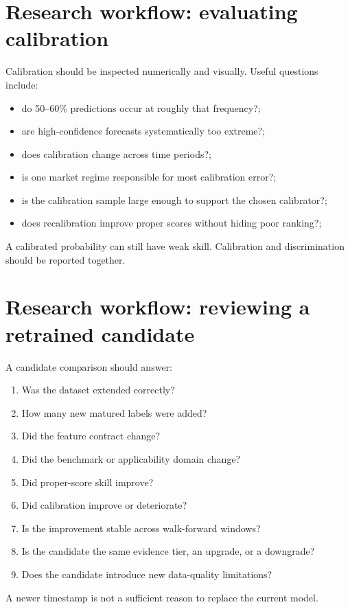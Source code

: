 \documentclass[11pt]{article}
\begin{document}
\section{Research workflow: evaluating calibration}
Calibration should be inspected numerically and visually. Useful questions include:
\begin{itemize}[itemsep=0.15em]
\item do 50--60\% predictions occur at roughly that frequency?;
\item are high-confidence forecasts systematically too extreme?;
\item does calibration change across time periods?;
\item is one market regime responsible for most calibration error?;
\item is the calibration sample large enough to support the chosen calibrator?;
\item does recalibration improve proper scores without hiding poor ranking?;
\end{itemize}

A calibrated probability can still have weak skill. Calibration and discrimination should be reported together.

\section{Research workflow: reviewing a retrained candidate}
A candidate comparison should answer:
\begin{enumerate}[itemsep=0.2em]
\item Was the dataset extended correctly?
\item How many new matured labels were added?
\item Did the feature contract change?
\item Did the benchmark or applicability domain change?
\item Did proper-score skill improve?
\item Did calibration improve or deteriorate?
\item Is the improvement stable across walk-forward windows?
\item Is the candidate the same evidence tier, an upgrade, or a downgrade?
\item Does the candidate introduce new data-quality limitations?
\end{enumerate}

A newer timestamp is not a sufficient reason to replace the current model.
\end{document}
